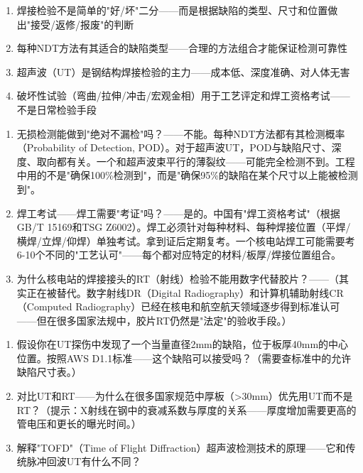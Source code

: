 \documentclass[a4paper,11pt]{ctexbook}
\newenvironment{lessonsummary}{\vspace{0.3cm}\noindent\begin{tcolorbox}[colback=summarybg,colframe=green!50!black,title=\textbf{总结}]\vspace{0.1cm}}{\end{tcolorbox}\vspace{0.3cm}}
\newenvironment{discuss}{\vspace{0.3cm}\noindent\begin{tcolorbox}[colback=discussbg,colframe=orange!60!black,title=\textbf{讨论题}]\vspace{0.1cm}}{\end{tcolorbox}\vspace{0.3cm}}
\newenvironment{exercises}{\vspace{0.3cm}\noindent\begin{tcolorbox}[colback=blue!3!white,colframe=blue!50!black,title=\textbf{课后练习}]\vspace{0.1cm}}{\end{tcolorbox}\vspace{0.3cm}}
\begin{document}
\begin{lessonsummary}
\begin{enumerate}
  \item 焊接检验不是简单的"好/坏"二分——而是根据缺陷的类型、尺寸和位置做出"接受/返修/报废"的判断
  \item 每种NDT方法有其适合的缺陷类型——合理的方法组合才能保证检测可靠性
  \item 超声波（UT）是钢结构焊接检验的主力——成本低、深度准确、对人体无害
  \item 破坏性试验（弯曲/拉伸/冲击/宏观金相）用于工艺评定和焊工资格考试——不是日常检验手段
\end{enumerate}
\end{lessonsummary}

\begin{discuss}
\begin{enumerate}
  \item 无损检测能做到"绝对不漏检"吗？——不能。每种NDT方法都有其检测概率（Probability of Detection, POD）。对于超声波UT，POD与缺陷尺寸、深度、取向都有关。一个和超声波束平行的薄裂纹——可能完全检测不到。工程中用的不是"确保100\%检测到"，而是"确保95\%的缺陷在某个尺寸以上能被检测到"。
  \item 焊工考试——焊工需要"考证"吗？——是的。中国有"焊工资格考试"（根据GB/T 15169和TSG Z6002）。焊工必须针对每种材料、每种焊接位置（平焊/横焊/立焊/仰焊）单独考试。拿到证后定期复考。一个核电站焊工可能需要考6-10个不同的"工艺认可"——每个都对应特定的材料/板厚/焊接位置组合。
  \item 为什么核电站的焊接接头的RT（射线）检验不能用数字代替胶片？——（其实正在被替代。数字射线DR（Digital Radiography）和计算机辅助射线CR（Computed Radiography）已经在核电和航空航天领域逐步得到标准认可——但在很多国家法规中，胶片RT仍然是"法定"的验收手段。）
\end{enumerate}
\end{discuss}

\begin{exercises}
\begin{enumerate}
  \item 假设你在UT探伤中发现了一个当量直径2mm的缺陷，位于板厚40mm的中心位置。按照AWS D1.1标准——这个缺陷可以接受吗？（需要查标准中的允许缺陷尺寸表。）
  \item 对比UT和RT——为什么在很多国家规范中厚板（>30mm）优先用UT而不是RT？（提示：X射线在钢中的衰减系数与厚度的关系——厚度增加需要更高的管电压和更长的曝光时间。）
  \item 解释"TOFD"（Time of Flight Diffraction）超声波检测技术的原理——它和传统脉冲回波UT有什么不同？
\end{enumerate}
\end{exercises}
\end{document}
